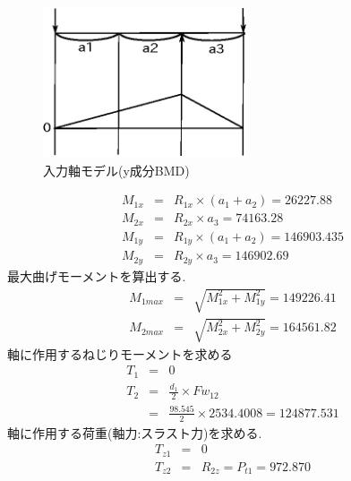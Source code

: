 \begin{figure}[htbp]
\begin{center}
\includegraphics[width=6cm]{../pictures/onecwy.eps}
\end{center}
\caption{入力軸モデル(y成分BMD)}
\end{figure}
\begin{eqnarray}
M_{1x} &=& R_{1x} \times (a_1+a_2)=26227.88\\
M_{2x} &=& R_{2x} \times a_3=74163.28\\
M_{1y} &=& R_{1y} \times (a_1+a_2)=146903.435\\
M_{2y} &=& R_{2y} \times a_3=146902.69
\end{eqnarray}
最大曲げモーメントを算出する.
\begin{eqnarray}
M_{1max} &=& \sqrt {M_{1x}^2+M_{1y}^2}=149226.41\\
M_{2max} &=& \sqrt {M_{2x}^2+M_{2y}^2}=164561.82
\end{eqnarray}
軸に作用するねじりモーメントを求める
\begin{eqnarray}
T_{1} &=& 0\\
T_{2} &=& \frac{d_1}{2} \times Fw_{12}\\
      &=& \frac{98.545}{2} \times 2534.4008 = 124877.531
\end{eqnarray}
軸に作用する荷重(軸力:スラスト力)を求める.
\begin{eqnarray}
T_{z1} &=& 0\\
T_{z2} &=& R_{2z} = P_{t1} = 972.870
\end{eqnarray}






\newpage

